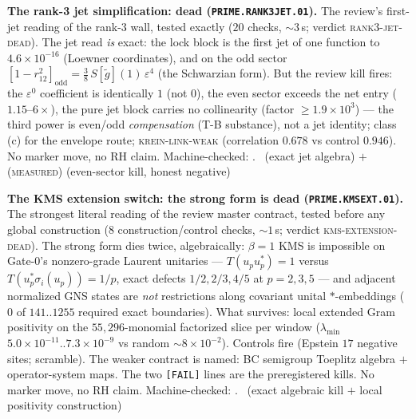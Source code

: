 \documentclass[11pt,a4paper]{article}
\theoremstyle{definition}
\begin{document}
\par\smallskip\noindent\textbf{The rank-3 jet simplification: dead
(\texttt{PRIME.RANK3JET.01}).}
The review's first-jet reading of the rank-3 wall, tested exactly
($20$ checks, ${\sim}3$\,s; verdict \textsc{rank3-jet-dead}).  The
jet read \emph{is} exact: the lock block is the first jet of one
function to $4.6\times10^{-16}$ (Loewner coordinates), and on the
odd sector
$[1-r_{12}^2]_{\mathrm{odd}}=\tfrac38\,S[\tilde g](1)\,
\varepsilon^4$ (the Schwarzian form).  But the review kill fires:
the $\varepsilon^0$ coefficient is identically $1$ (not $0$), the
even sector exceeds the net entry ($1.15$--$6\times$), the pure jet
block carries no collinearity (factor $\ge1.9\times10^3$) --- the
third power is even/odd \emph{compensation} (T-B substance), not a
jet identity; class (c) for the envelope route;
\textsc{krein-link-weak} (correlation $0.678$ vs control $0.946$).
No marker move, no RH claim.
Machine-checked: .
\mE\ (exact jet algebra) $+$ (\textsc{measured}) (even-sector kill,
honest negative)
\par\smallskip

\par\smallskip\noindent\textbf{The KMS extension switch: the strong
form is dead (\texttt{PRIME.KMSEXT.01}).}
The strongest literal reading of the review master contract, tested
before any global construction ($8$ construction/control checks,
${\sim}1$\,s; verdict \textsc{kms-extension-dead}).  The strong form
dies twice, algebraically: $\beta=1$ KMS is impossible on Gate-0's
nonzero-grade Laurent unitaries --- $T(u_pu_p^*)=1$ versus
$T(u_p^*\sigma_i(u_p))=1/p$, exact defects $1/2,2/3,4/5$ at
$p=2,3,5$ --- and adjacent normalized GNS states are \emph{not}
restrictions along covariant unital $*$-embeddings ($0$ of
$141..1255$ required exact boundaries).  What survives: local
extended Gram positivity on the $55{,}296$-monomial factorized
slice per window ($\lambda_{\min}$
$5.0\times10^{-11}..7.3\times10^{-9}$ vs random ${\sim}8\times
10^{-2}$).  Controls fire (Epstein $17$ negative sites; scramble).
The weaker contract is named: BC semigroup Toeplitz algebra $+$
operator-system maps.  The two \texttt{[FAIL]} lines are the
preregistered kills.  No marker move, no RH claim.
Machine-checked: .
\mE\ (exact algebraic kill $+$ local positivity construction)
\par\smallskip
\end{document}
